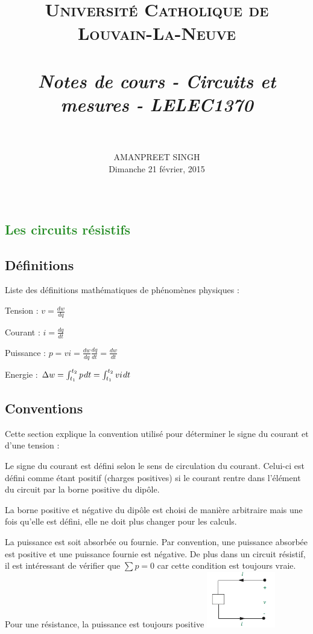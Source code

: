 \documentclass[11pt]{report}
\title{
        \usefont{OT1}{bch}{b}{n}
        \normalfont \normalsize \textsc{Université Catholique de Louvain-La-Neuve } \\ [25pt]
        \horrule{0.5pt} \\[0.4cm]
        \huge \emph{Notes de cours - Circuits et mesures - LELEC1370} \\
        \horrule{2pt} \\[0.5cm]
}
\author{
        \normalfont                                 \normalsize
            \normalsize
    AMANPREET SINGH\\
        Dimanche 21 février, 2015 \\\\
}
\date{}
\begin{document}
\maketitle
\newpage

\tableofcontents
\textcolor{forestgreen}{\chapter{Les circuits résistifs}}
\section{Définitions}
Liste des définitions mathématiques de phénomènes physiques :
\begin{framed}
 Tension : $v = \frac{dw}{dq}$ \left[ V \right]  \newline

 Courant : $i = \frac{dq}{dt}$ \left[ A \right] \newline

 Puissance : $p = vi = \frac{dw}{dq}\frac{dq}{dt} = \frac{dw}{dt}$ \left[ W \right] \newline

 Energie : $\Delta w = \int _{ { t }_{ 1 } }^{ { t }_{ 2 } }{ p\hspace{0.3mm}dt } = \int _{ { t }_{ 1 } }^{ { t }_{ 2 } }{ vi\hspace{0.3mm}dt } $ \left[ J \right]
\end{framed}
\section{Conventions}
Cette section explique la convention utilisé pour déterminer le signe du courant et d'une tension :
\begin{framed}
   Le signe du courant est défini selon le sens de circulation du courant. Celui-ci est défini comme étant positif (charges positives) si le courant rentre dans l'élément du circuit par la borne positive du dipôle.\newline

   La borne positive et négative du dipôle est choisi de manière arbitraire mais une fois qu'elle est défini, elle ne doit plus changer pour les calculs.\newline

   La puissance est soit absorbée ou fournie. Par convention, une puissance absorbée est positive et une puissance fournie est négative. De plus dans un circuit résistif, il est intéressant de vérifier que $\sum { p } =0$ car cette condition est toujours vraie.\\

  Pour une résistance, la puissance est toujours positive \newline
  \includegraphics[width=3cm]{1.png}

\end{framed}
\newpage
\end{document}
